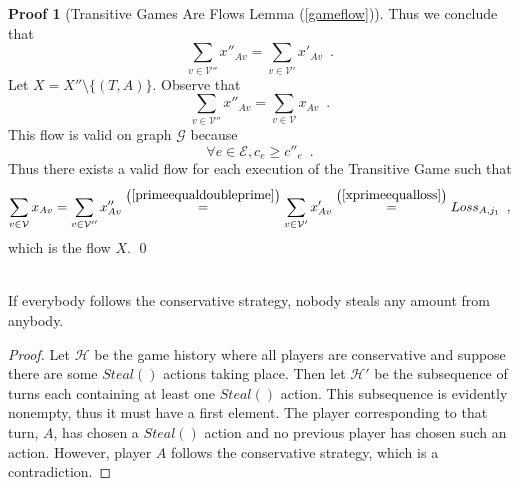 \documentclass[11pt]{llncs}
\theoremstyle{definition}
\newtheorem{sepproof}{Proof}
\begin{document}
\begin{sepproof}[Transitive Games Are Flows Lemma (\ref{gameflow})]
       Thus we conclude that
       \begin{equation}
       \label{primeequaldoubleprime}
          \sum\limits_{v \in \mathcal{V}''}x''_{Av} = \sum\limits_{v \in \mathcal{V}'}x'_{Av} \enspace.
       \end{equation}
       Let $X = X'' \setminus \{(T, A)\}$. Observe that
       \begin{equation*}
          \sum\limits_{v \in \mathcal{V}''}x''_{Av} = \sum\limits_{v \in \mathcal{V}}x_{Av} \enspace.
       \end{equation*}
       This flow is valid on graph $\mathcal{G}$ because
       \begin{equation*}
          \forall e \in \mathcal{E}, c_e \geq c''_e \enspace.
       \end{equation*}
       Thus there exists a valid flow for each execution of the Transitive Game such that
       \begin{equation*}
          \sum\limits_{v \in \mathcal{V}}x_{Av} = \sum\limits_{v \in \mathcal{V}''}x''_{Av}
          \overset{\left(\ref{primeequaldoubleprime}\right)}{=} \sum\limits_{v \in \mathcal{V}'}x'_{Av}
          \overset{\left(\ref{xprimeequalloss}\right)}{=} Loss_{A, j_1} \enspace,
       \end{equation*}
       which is the flow $X$. \qed
    \end{sepproof}

    \begin{theorem} \ \\
       \label{conservativeworld}
       If everybody follows the conservative strategy, nobody steals any amount from anybody.
    \end{theorem}
     \begin{proof}
        Let $\mathcal{H}$ be the game history where all players are conservative and suppose there are some
        $Steal\left(\right)$ actions taking place. Then let $\mathcal{H}'$ be the subsequence of turns each containing at
        least one $Steal\left(\right)$ action. This subsequence is evidently nonempty, thus it must have a first element. The
        player corresponding to that turn, $A$, has chosen a $Steal\left(\right)$ action and no previous player has chosen
        such an action. However, player $A$ follows the conservative strategy, which is a contradiction.
     \end{proof}
\end{document}
